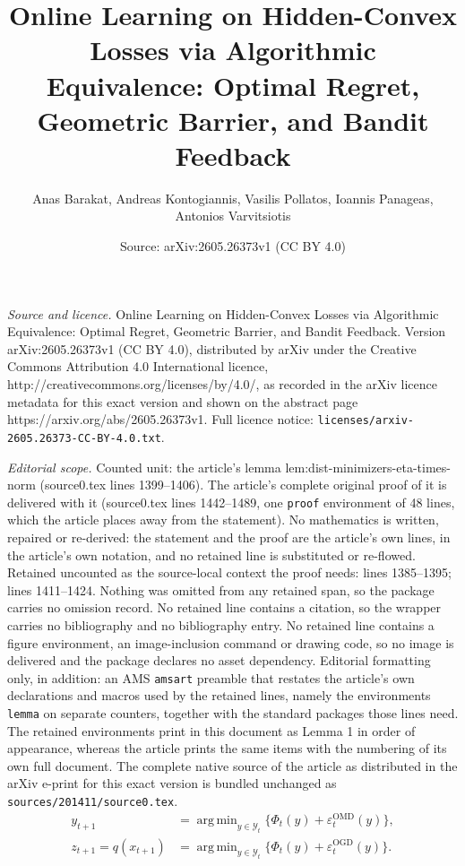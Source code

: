 \documentclass[10pt,a4paper]{amsart}
\title{\Large{Online Learning on Hidden-Convex Losses via Algorithmic Equivalence: Optimal Regret, Geometric Barrier, and Bandit Feedback}}
\author{Anas Barakat, Andreas Kontogiannis, Vasilis Pollatos, Ioannis Panageas, Antonios Varvitsiotis}
\date{Source: arXiv:2605.26373v1 (CC BY 4.0)}
\def\Y{{\mathcal Y}}
\DeclareMathOperator*{\argmin}{arg\,min}
\begin{document}
\maketitle

\noindent\emph{Source and licence.} \Large{Online Learning on Hidden-Convex Losses via Algorithmic Equivalence: Optimal Regret, Geometric Barrier, and Bandit Feedback}. Version arXiv:2605.26373v1 (CC BY 4.0), distributed by arXiv under the Creative Commons Attribution 4.0 International licence, http://creativecommons.org/licenses/by/4.0/, as recorded in the arXiv licence metadata for this exact version and shown on the abstract page https://arxiv.org/abs/2605.26373v1. Full licence notice: \texttt{licenses/arxiv-2605.26373-CC-BY-4.0.txt}.\par\smallskip

\noindent\textit{Editorial scope.} Counted unit: the article's lemma lem:dist-minimizers-eta-times-norm (source0.tex lines 1399--1406). The article's complete original proof of it is delivered with it (source0.tex lines 1442--1489, one \texttt{proof} environment of 48 lines, which the article places away from the statement). No mathematics is written, repaired or re-derived: the statement and the proof are the article's own lines, in the article's own notation, and no retained line is substituted or re-flowed.  Retained uncounted as the source-local context the proof needs: lines 1385--1395; lines 1411--1424.  Nothing was omitted from any retained span, so the package carries no omission record.  No retained line contains a citation, so the wrapper carries no bibliography and no bibliography entry.  No retained line contains a figure environment, an image-inclusion command or drawing code, so no image is delivered and the package declares no asset dependency.  Editorial formatting only, in addition: an AMS \texttt{amsart} preamble that restates the article's own declarations and macros used by the retained lines, namely the environments \texttt{lemma} on separate counters, together with the standard packages those lines need.  The retained environments print in this document as Lemma 1 in order of appearance, whereas the article prints the same items with the numbering of its own full document.  The complete native source of the article as distributed in the arXiv e-print for this exact version is bundled unchanged as \texttt{sources/201411/source0.tex}.
\begin{align}
y_{t+1}
&=
\argmin_{y\in \Y_t}\{\Phi_t(y)+\varepsilon_t^{\mathrm{OMD}}(y)\},
\label{eq:min1}
\\
z_{t+1} = q(x_{t+1})
&=
\argmin_{y\in \Y_t}\{\Phi_t(y)+\varepsilon_t^{\mathrm{OGD}}(y)\}.
\label{eq:min2}
\end{align}
\end{document}
